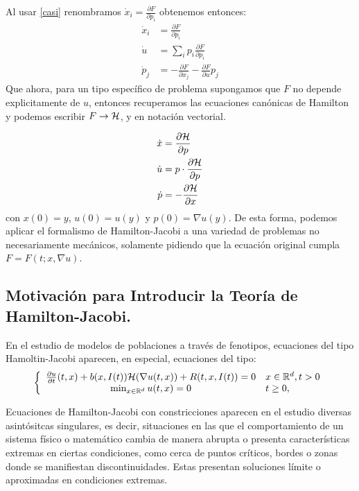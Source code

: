 Al usar \eqref{casi} renombramos $\dot x_i=\frac{\partial F}{\partial p_i}$ obtenemos entonces:
\begin{equation*}
	\begin{split}
			\dot x_i&=\frac{\partial F}{\partial p_i}\\
			\dot{u}&=\sum_i p_i\frac{\partial F}{\partial p_i}\\
			\dot p_j&=-\frac{\partial F}{\partial x_j}-\frac{\partial F}{\partial u}p_j
	\end{split}
\end{equation*}
Que ahora, para un tipo espec\'ifico de problema supongamos que $F$ no depende explicitamente de $u$, entonces recuperamos las ecuaciones can\'onicas de Hamilton y podemos escribir $F\to\mathcal{H}$, y en notaci\'on vectorial.

\begin{equation*}
	\begin{split}
			\dot x&=\frac{\partial \mathcal{H}}{\partial p}\\
			\dot{u}&=p\cdot \frac{\partial \mathcal{H}}{\partial p}\\
			\dot p&=-\frac{\partial \mathcal{H}}{\partial x}
	\end{split}
\end{equation*}
con $x(0)=y$, $u(0)=u(y)$ y $p(0)=\nabla u(y)$.
De esta forma, podemos aplicar el formalismo de Hamilton-Jacobi a una variedad de problemas no necesariamente mec\'anicos, solamente pidiendo que la ecuaci\'on original cumpla $F=F(t;x,\nabla u)$.
 \subsection{Motivación para Introducir la Teoría de Hamilton-Jacobi.}
 
 En el estudio de modelos de poblaciones a trav\'es de fenotipos, ecuaciones del tipo Hamoltin-Jacobi aparecen, en especial, ecuaciones del tipo:
            \begin{equation*}
            \left\{ 
  \begin{array}{ c l }
    \frac{\partial u}{\partial t}(t,x)+b(x,I(t))\mathcal{H} (\nabla u(t,x))+R(t,x,I(t))=0 & x\in\mathbb{R}^d,t>0\\
                \min_{x\in\mathbb{R}^d} u(t,x)=0&t\geq0,
  \end{array}
\right.
            \end{equation*}

            \normalsize{\citep{Barles2006} Ecuaciones de Hamilton-Jacobi con constricciones aparecen en el estudio diversas asintósitcas singulares, es decir, situaciones en las que el comportamiento de un sistema físico o matemático cambia  de manera abrupta o presenta características extremas en ciertas condiciones, como cerca de puntos críticos, bordes o zonas donde se manifiestan discontinuidades. Estas presentan soluciones límite o aproximadas en condiciones extremas.
            }\\


